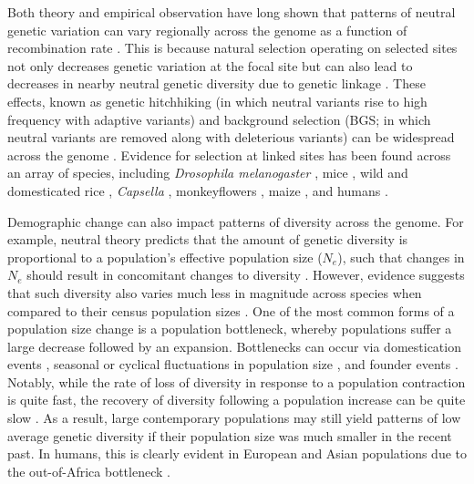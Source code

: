 \documentclass[9pt,twocolumn,twoside]{rilabRxiv}
\begin{document}
Both theory and empirical observation have long shown that patterns of neutral genetic variation can vary regionally across the genome as a function of recombination rate \citep{smith1974hitch, begun1992levels}.
This is because natural selection operating on selected sites not only decreases genetic variation at the focal site but can also lead to decreases in nearby neutral genetic diversity due to genetic linkage \citep{cutter2013genomic}.
These effects, known as genetic hitchhiking \citep{smith1974hitch} (in which neutral variants rise to high frequency with adaptive variants) and background selection \citep{charlesworth1993effect} (BGS; in which neutral variants are removed along with deleterious variants) can be widespread across the genome \citep{elyashiv2016genomic}.
Evidence for selection at linked sites has been found across an array of species, including \textit{Drosophila melanogaster} \citep{begun1992levels, comeron2014background, charlesworth1996background, andolfatto2007hitchhiking, sella2009pervasive, elyashiv2016genomic}, mice \citep{keightley2018understanding}, wild and domesticated rice \citep{flowers2011natural, xu2012resequencing}, \textit{Capsella} \citep{williamson2014evidence}, monkeyflowers \citep{stankowski2018tempo}, maize \citep{beissinger2016recent}, and humans \citep{sabeti2002detecting, reed2005fitting, voight2006map, mcvicker2009widespread, cai2009pervasive, hernandez2011classic, lohmueller2011natural}.

Demographic change can also impact patterns of diversity across the genome.
For example, neutral theory predicts that the amount of genetic diversity is proportional to a population’s effective population size (\textit{$N_e$}), such that changes in \textit{$N_e$} should result in concomitant changes to diversity \citep{kimura1983neutral}.
However, evidence suggests that such diversity also varies much less in magnitude across species when compared to their census population sizes \citep{lewontin1974genetic, leffler2012revisiting}.
One of the most common forms of a population size change is a population bottleneck, whereby populations suffer a large decrease followed by an expansion.
Bottlenecks can occur via domestication events \citep{doebley2006molecular, tang2010domestication, wiener2011deciphering, gaut2018demography}, seasonal or cyclical fluctuations in population size \citep{elton1924periodic, ives1970further, itoh2009seasonal, noren2014genetic}, and founder events \citep{david1988genetic, dlugosch2008founding, henn2012great}.
Notably, while the rate of loss of diversity in response to a population contraction is quite fast, the recovery of diversity following a population increase can be quite slow \citep{charlesworth2009effective}.
As a result, large contemporary populations may still yield patterns of low average genetic diversity if their population size was much smaller in the recent past.
In humans, this is clearly evident in European and Asian populations due to the out-of-Africa bottleneck \citep{10002015global}.
\end{document}
